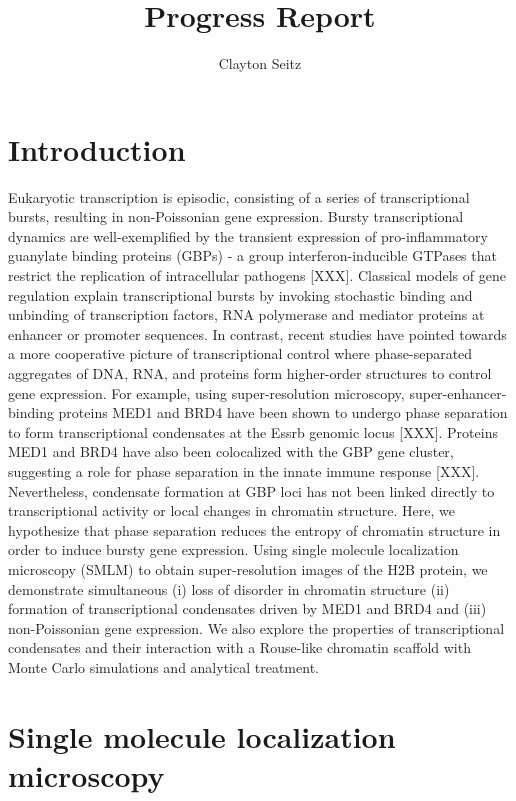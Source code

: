 \documentclass{article}
\begin{document}
\title{Progress Report}
\author{Clayton Seitz}
\maketitle
\thispagestyle{empty}


\section{Introduction}

Eukaryotic transcription is episodic, consisting of a series of transcriptional bursts, resulting in non-Poissonian gene expression. Bursty transcriptional dynamics are well-exemplified by the transient expression of pro-inflammatory guanylate binding proteins (GBPs) - a group interferon-inducible GTPases that restrict the replication of intracellular pathogens [XXX]. Classical models of gene regulation explain transcriptional bursts by invoking stochastic binding and unbinding of transcription factors, RNA polymerase and mediator proteins at enhancer or promoter sequences. In contrast, recent studies have pointed towards a more cooperative picture of transcriptional control where phase-separated aggregates of DNA, RNA, and proteins form higher-order structures to control gene expression. For example, using super-resolution microscopy, super-enhancer-binding proteins MED1 and BRD4 have been shown to undergo phase separation to form transcriptional condensates at the Essrb genomic locus [XXX]. Proteins MED1 and BRD4 have also been colocalized with the GBP gene cluster, suggesting a role for phase separation in the innate immune response [XXX]. Nevertheless, condensate formation at GBP loci has not been linked directly to transcriptional activity or local changes in chromatin structure. Here, we hypothesize that phase separation reduces the entropy of chromatin structure in order to induce bursty gene expression. Using single molecule localization microscopy (SMLM) to obtain super-resolution images of the H2B protein, we demonstrate simultaneous (i) loss of disorder in chromatin structure (ii) formation of transcriptional condensates driven by MED1 and BRD4 and (iii) non-Poissonian gene expression. We also explore the properties of transcriptional condensates and their interaction with a Rouse-like chromatin scaffold with Monte Carlo simulations and analytical treatment.

\section{Single molecule localization microscopy}
\end{document}
